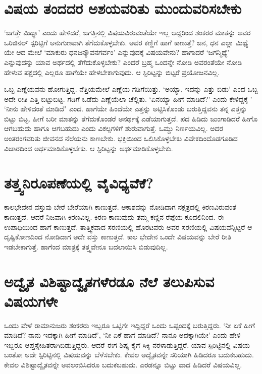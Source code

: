 \section*{ವಿಷಯ ತಂದದರ ಅಶಯವರಿತು ಮುಂದುವರಿಸಬೇಕು}

`ಜಗತ್ತೇ ಮಿಥ್ಯಾ' ಎಂದು ಹೇಳಿದರೆ, ಜಗತ್ತಿನಲ್ಲಿ ವಿಷಯವಿರುವಂತೆಯೇ ಇಲ್ಲ ಆದ್ದರಿಂದ ಶಂಕರರ ಮಾತನ್ನು ಅವರ ಒರಿಜಿನಲ್ ಸ್ಪರಿಟ್ಟಿಗೆ ಅನುಗುಣವಾಗಿ ತೆಗೆದುಕೊಳ್ಳಬೇಕು. ಅವರ ಕಣ್ಣಿಗೆ ಹಾಗೆ ಕಾಣುತ್ತೆ? ಜನ, ಧನ ಎಲ್ಲಾ ಮಿಥ್ಯೆ ಯೇ ಆದ ಮೇಲೆ `ಮಾಕುರು ಧನಜನ್ಯೌವನಗರ್ವಂ'\label{60} ಎನ್ನುವುದಕ್ಕೆ ವಿಷಯವೇನು? ಹಾಗಾದರೆ `ಜಗನ್ಮಿಥ್ಯೆ' ಎನ್ನುವುದನ್ನು ಯಾವ ಅರ್ಥದಲ್ಲಿ ತೆಗೆದುಕೊಳ್ಳಬೇಕು? ಎಂದರೆ ಬ್ರಹ್ಮ ಒಂದನ್ನೇ ನೋಡಿ ಅವರಂತೆಯೇ ನೋಡಿ ಹೇಳುವ ಪಕ್ಷದಲ್ಲಿ ಎಲ್ಲರೂ ಹಾಗೆಯೇ ಹೇಳಬೇಕಾಗುವುದು. ಆ ಸ್ಪಿರಿಟ್ಟನ್ನು ಬಿಟ್ಟರೆ ಪ್ರಯೋಜನವಿಲ್ಲ.

ಒಬ್ಬ ಎಣ್ಣೆಯವನು ಹೋಗುತ್ತಿದ್ದ. ನೆತ್ತಿಯಮೇಲೆ ಎಣ್ಣೆಯ ಗಡಿಗೆಯಿತ್ತು. `ಅಯ್ಯಾ, ಇದನ್ನು ಎತ್ತು ಬಿಡು' ಎಂದ ಒಬ್ಬ ಅದೇ ರೀತಿ ಎತ್ತಿ ಬಿಟ್ಟುಬಿಟ್ಟ. ಗಡಿಗೆ ಒಡೆದು ಎಣ್ಣೆಯೆಲಾ ಚೆಲ್ಲಿತು. `ಏನಯ್ಯಾ ಹೀಗೆ ಮಾಡಿದೆ?' ಎಂದು ಕೇಳಿದ್ದಕ್ಕೆ ' `ನೀನು ಹೇಳಿದಂತೆ ಮಾಡಿದೆ" ಎಂದ. ಹಾಗೆಯೇ ಹಿಂದೆಯೇ ಎತ್ತನ್ನು ಅಟ್ಟಿಸಿಕೊಂಡು ಬರುತ್ತಿದ್ದವನು ತನ್ನ ಎತ್ತನ್ನು ಬಿಟ್ಟು ಬಿಟ್ಟ. ಹೀಗೆ ಬರೀ ಮಾತನ್ನು ತೆಗೆದುಕೊಂಡರೆ ಅನರ್ಥಕ್ಕೆ ಎಡೆಯಾಗುತ್ತದೆ. ಪದ ಹಿಡಿದು ಜುಂಗಾಡಿದರೆ ಹೀಗೊ ಆಗಬಹುದು ಹಾಗೂ ಆಗಬಹುದು ಎಂದು ವಿಕಲ್ಪಗಳಿಗೆ ಶುರುವಾಗುತ್ತೆ. ಒಮ್ದು ನಿರ್ಣಯವಿಲ್ಲ. ಅದರ ಅಂತರಂಗವರಿತು ಜೀವನದ ನೆಲೆಯನು ಕಾಣಬೇಕು. ಭಕ್ತಿಯಿಂದ ಒಲಿಸಿಕೊಳ್ಳಬೇಕು ವಿವೇಕದಿಂದೊಡಗೂಡಿದ ವಿಚಾರದಿಂದ ಅರ್ಥಮಾಡಿಕೊಳ್ಳಬೇಕು. ಆ ಸ್ಪಿರಿಟ್ಟನ್ನು ಅರ್ಥಮಾಡಿಕೊಳ್ಳಬೇಕು.

\section*{ತತ್ತ್ವನಿರೂಪಣೆಯಲ್ಲಿ ವೈವಿಧ್ಯವೆಕೆ?}

ಕಾಲಭೇದೇನ ವಸ್ತುವು ಬೇರೆ ಬೇರೆಯಾಗಿ ಕಾಣುತ್ತದೆ. ಆಕಾಶವನ್ನು ನೋಡಿದಾಗ ನಕ್ಷತ್ರದಲ್ಲಿ ಕಿರಣವಿರುವಂತೆ ಕಾಣುತ್ತದೆ. ಆದರೆ ನಿಜವಾಗಿ ಕಿರಣವಿಲ್ಲ. ಕಿರಣ ಕಾಣುವುದು ತಮ್ಮ ಕಣ್ಣಿನ ರೆಪ್ಪೆಯ ಕೂದಲಿನಿಂದ. ಈ ಉಪಾಧಿಯಿಂದ ಹಾಗೆ ಕಾಣುತ್ತದೆ. ತಾತ್ತ್ವಿಕವಾದ ಸರಣಿಯಲ್ಲಿ ಹೊರಟವರು ಅವರ ಸರಣಿಯಲ್ಲಿ ವಿಷಯವನ್ನಿಟ್ಟರೆ ಆ ದೃಷ್ಟಿಕೋಣದಿಂದ ನೋಡಿದಾಗ ಅದೇ ವಸ್ತು ಕಾಣುತ್ತದೆ. ಕಾಲ ಭೇದೇನ ಒಂದೇ ವಿಷಯವನ್ನು ಬೇರೆ ರೀತಿ ಇಡಬೇಕಾಗುತ್ತೆ. ಹಾಗೆಂದ ಮಾತ್ರಕ್ಕೆ ತತ್ತ್ವವೇನೂ ಬದಲಾಯಿಸಿ ಬಿಡುವುದಿಲ್ಲ.

\section*{ಅದ್ವೈತ ವಿಶಿಷ್ಟಾದ್ವೈತಗಳೆರಡೂ ನೆಲೆ ತಲುಪಿಸುವ ವಿಷಯಗಳೇ}

ಒಂದು ವೇಳೆ ರಾಮಾನುಜರು ಶಂಕರರು ಇಬ್ಬರೂ ಒಟ್ಟಿಗೇ ಇದ್ದಿದ್ದರೆ ಒಂದು ಒಪ್ಪಂದಕ್ಕೆ ಬರುತ್ತಿದ್ದರು. `ನೀ ಏಕೆ ಹೀಗೆ ಮಾಡಿದೆ? ನಾನು ಇದಕ್ಕಾಗಿ ಹೀಗೆ ಮಾಡಿದೆ', `ನೀ ಏಕೆ ಹಾಗೆ ಮಾಡಿದೆ? ನಾನೂ ಅದಕ್ಕಾಗಿಯೇ' ಎಂದು ಹೇಳಿ ಇಬ್ಬರೂ ಆಪ್ತಸ್ನೇಹಿತರಾಗಿಬಿಡುತ್ತಿದ್ದರು. ಆದರೆ ಈಗ ಶಿಷ್ಯ ಕೈಗೆ ಸಿಕ್ಕಿ ನರಳಾಡುತ್ತಿದ್ದರೆ. ಯಾವ ಸ್ಪಿರಿಟ್ಟಿನಲ್ಲಿ ವಿಷಯ ಬಂತೋ ಅದೇ ಸ್ಪಿರಿಟ್ಟಿನಲ್ಲಿ ವಿಷಯವನ್ನು ಬೆಳೆಸಬೇಕು. ಕೇವಲ ಅದ್ವೈತವನ್ನೇ ಸರಿಯಾಗಿ ಹಿಡಿದರೂ ಬದುಕಬಹುದು. ಕೇವಲ ವಿಶಿಷ್ಟಾದ್ವೈತವನ್ನೇ ಅವಲಂಬಿಸಿದರೂ ಬದುಕಬಹುದು. ಎರಡನ್ನೂ ಬಿಟ್ಟು ವಾದ ಹಿಡಿದರೆ ವಿಷಯವಿಲ್ಲ.

